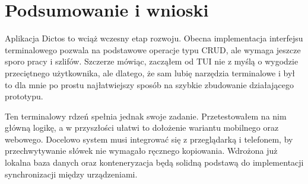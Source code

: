 \documentclass[times]{san}
\begin{document}
\section{Podsumowanie i wnioski}

Aplikacja Dictos to wciąż wczesny etap rozwoju. Obecna implementacja interfejsu terminalowego pozwala na podstawowe operacje typu CRUD, ale wymaga jeszcze sporo pracy i szlifów. Szczerze mówiąc, zacząłem od TUI nie z myślą o wygodzie przeciętnego użytkownika, ale dlatego, że sam lubię narzędzia terminalowe i był to dla mnie po prostu najłatwiejszy sposób na szybkie zbudowanie działającego prototypu.

Ten terminalowy rdzeń spełnia jednak swoje zadanie. Przetestowałem na nim główną logikę, a w przyszłości ułatwi to dołożenie wariantu mobilnego oraz webowego. Docelowo system musi integrować się z przeglądarką i telefonem, by przechwytywanie słówek nie wymagało ręcznego kopiowania. Wdrożona już lokalna baza danych oraz konteneryzacja będą solidną podstawą do implementacji synchronizacji między urządzeniami.

\spistabel
\spisrysunkow
\printbibliography
\end{document}
